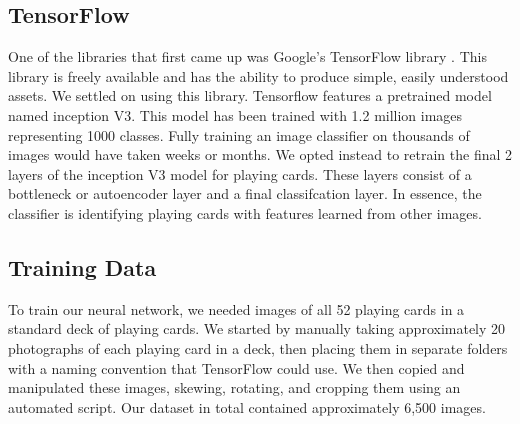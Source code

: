 \documentclass[letterpaper]{article}
\begin{document}
\subsection{TensorFlow}
One of the libraries that first came up was Google's TensorFlow library \cite{tensorflow}.  This library is freely available and has the ability to produce simple, easily understood assets.  We settled on using this library.
Tensorflow features a pretrained model named inception V3.  This model has been trained with 1.2 million images representing 1000 classes.  Fully training an image classifier on thousands of images would have taken weeks or months.  We opted instead to retrain the final 2 layers of the inception V3 model for playing cards.  These layers consist of a bottleneck or autoencoder layer and a final classifcation layer.  In essence, the classifier is identifying playing cards with features learned from other images. 

\subsection{Training Data}
To train our neural network, we needed images of all 52 playing cards in a standard deck of playing cards.  We started by manually taking approximately 20 photographs of each playing card in a deck, then placing them in separate folders with a naming convention that TensorFlow could use.  We then copied and manipulated these images, skewing, rotating, and cropping them using an automated script. Our dataset in total contained approximately 6,500 images.
\end{document}
